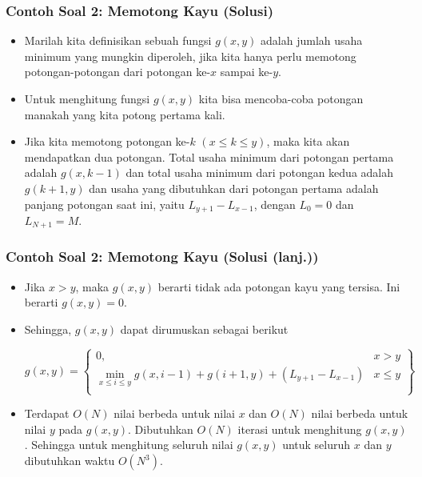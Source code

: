 \begin{frame}
\frametitle{Contoh Soal 2: Memotong Kayu (Solusi)}
\begin{itemize}
  \item Marilah kita definisikan sebuah fungsi $g(x,y)$ adalah jumlah usaha minimum yang mungkin diperoleh, jika kita hanya perlu memotong potongan-potongan dari potongan ke-$x$ sampai ke-$y$.
  \item Untuk menghitung fungsi $g(x,y)$ kita bisa mencoba-coba potongan manakah yang kita potong pertama kali.
  \item Jika kita memotong potongan ke-$k$ $(x \leq k \leq y)$, maka kita akan mendapatkan dua potongan. Total usaha minimum dari potongan pertama adalah $g(x,k-1)$ dan total usaha minimum dari potongan kedua adalah $g(k+1,y)$ dan usaha yang dibutuhkan dari potongan pertama adalah panjang potongan saat ini, yaitu $L_{y+1} - L_{x-1}$, dengan $L_0 = 0$ dan $L_{N+1} = M$.
\end{itemize}
\end{frame}

\begin{frame} 
\frametitle{Contoh Soal 2: Memotong Kayu (Solusi (lanj.))}
\begin{itemize}
  \item Jika $x>y$, maka $g(x,y)$ berarti tidak ada potongan kayu yang tersisa. Ini berarti $g(x,y) = 0$.
  \item Sehingga, $g(x,y)$ dapat dirumuskan sebagai berikut
  \begin{small}
  \[g(x,y) = \left\{\begin{array}{lr}
        0, & x>y\\
        \min_{x \leq i \leq y} g(x,i-1) + g(i+1,y) + (L_{y+1} - L_{x-1}) & x \leq y \\
        \end{array}\right\}\]
  \end{small}
  \item Terdapat $O(N)$ nilai berbeda untuk nilai $x$ dan $O(N)$ nilai berbeda untuk nilai $y$ pada $g(x,y)$. Dibutuhkan $O(N)$ iterasi untuk menghitung $g(x,y)$. Sehingga untuk menghitung seluruh nilai $g(x,y)$ untuk seluruh $x$ dan $y$ dibutuhkan waktu $O(N^3)$.
\end{itemize}
\end{frame}

